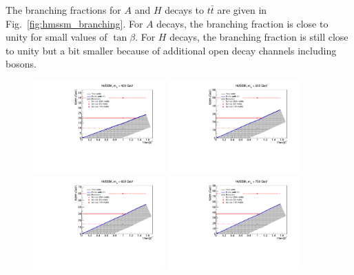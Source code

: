 The branching fractions for $A$ and $H$ decays to $t\bar t$ are given in Fig.~\ref{fig:hmssm_branching}.
For $A$ decays, the branching fraction is close to unity for small values of $\tan\beta$.
For $H$ decays, the branching fraction is still close to unity but a bit smaller because of additional open decay channels including bosons.
\begin{figure}[!Hhtb]
\centering
\includegraphics[width=0.45\textwidth,keepaspectratio=true]{fig/chapt8/hmssm/width_vs_tanb_mA400.pdf}
\includegraphics[width=0.45\textwidth,keepaspectratio=true]{fig/chapt8/hmssm/width_vs_tanb_mA500.pdf}
\includegraphics[width=0.45\textwidth,keepaspectratio=true]{fig/chapt8/hmssm/width_vs_tanb_mA600.pdf}
\includegraphics[width=0.45\textwidth,keepaspectratio=true]{fig/chapt8/hmssm/width_vs_tanb_mA750.pdf}

\end{figure}
